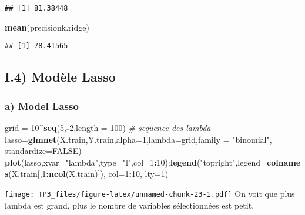 \documentclass[
]{article}
\newenvironment{Shaded}{\begin{snugshade}}{\end{snugshade}}
\newcommand{\CommentTok}[1]{\textcolor[rgb]{0.56,0.35,0.01}{\textit{#1}}}
\newcommand{\DataTypeTok}[1]{\textcolor[rgb]{0.13,0.29,0.53}{#1}}
\newcommand{\DecValTok}[1]{\textcolor[rgb]{0.00,0.00,0.81}{#1}}
\newcommand{\KeywordTok}[1]{\textcolor[rgb]{0.13,0.29,0.53}{\textbf{#1}}}
\newcommand{\NormalTok}[1]{#1}
\newcommand{\OperatorTok}[1]{\textcolor[rgb]{0.81,0.36,0.00}{\textbf{#1}}}
\newcommand{\OtherTok}[1]{\textcolor[rgb]{0.56,0.35,0.01}{#1}}
\newcommand{\StringTok}[1]{\textcolor[rgb]{0.31,0.60,0.02}{#1}}
\begin{document}
\begin{verbatim}
## [1] 81.38448
\end{verbatim}

\begin{Shaded}
\begin{Highlighting}[]
\KeywordTok{mean}\NormalTok{(precisionk.ridge)}
\end{Highlighting}
\end{Shaded}

\begin{verbatim}
## [1] 78.41565
\end{verbatim}

\hypertarget{i.4-moduxe8le-lasso}{%
\subsection{I.4) Modèle Lasso}\label{i.4-moduxe8le-lasso}}

\hypertarget{a-model-lasso}{%
\subsubsection{a) Model Lasso}\label{a-model-lasso}}

\begin{Shaded}
\begin{Highlighting}[]
\NormalTok{grid =}\StringTok{ }\DecValTok{10}\OperatorTok{^}\KeywordTok{seq}\NormalTok{(}\DecValTok{5}\NormalTok{,}\OperatorTok{-}\DecValTok{2}\NormalTok{,}\DataTypeTok{length =} \DecValTok{100}\NormalTok{) }\CommentTok{# sequence des lambda}
\NormalTok{lasso=}\KeywordTok{glmnet}\NormalTok{(X.train,Y.train,}\DataTypeTok{alpha=}\DecValTok{1}\NormalTok{,}\DataTypeTok{lambda=}\NormalTok{grid,}\DataTypeTok{family =} \StringTok{"binomial"}\NormalTok{, }\DataTypeTok{standardize=}\OtherTok{FALSE}\NormalTok{)}
\KeywordTok{plot}\NormalTok{(lasso,}\DataTypeTok{xvar=}\StringTok{"lambda"}\NormalTok{,}\DataTypeTok{type=}\StringTok{"l"}\NormalTok{,}\DataTypeTok{col=}\DecValTok{1}\OperatorTok{:}\DecValTok{10}\NormalTok{);}\KeywordTok{legend}\NormalTok{(}\StringTok{"topright"}\NormalTok{,}\DataTypeTok{legend=}\KeywordTok{colnames}\NormalTok{(X.train[,}\DecValTok{1}\OperatorTok{:}\KeywordTok{ncol}\NormalTok{(X.train)]), }\DataTypeTok{col=}\DecValTok{1}\OperatorTok{:}\DecValTok{10}\NormalTok{, }\DataTypeTok{lty=}\DecValTok{1}\NormalTok{)}
\end{Highlighting}
\end{Shaded}

\texttt{[image: TP3\_files/figure-latex/unnamed-chunk-23-1.pdf]} On voit
que plus lambda est grand, plus le nombre de variables sélectionnées est
petit.
\end{document}
